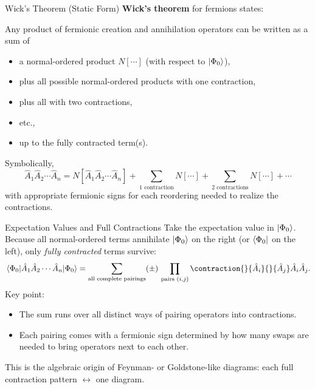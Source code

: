\documentclass[aspectratio=169]{beamer}
\begin{document}
\begin{frame}{Wick's Theorem (Static Form)}
\textbf{Wick's theorem} for fermions states:

Any product of fermionic creation and annihilation operators can be written
as a sum of
\begin{itemize}
    \item a normal-ordered product $N[\cdots]$ (with respect to $\ket{\Phi_0}$),
    \item plus all possible normal-ordered products with one contraction,
    \item plus all with two contractions,
    \item etc.,
    \item up to the fully contracted term(s).
\end{itemize}

Symbolically,
\begin{equation}
    \hat{A}_1 \hat{A}_2 \cdots \hat{A}_n
    =
    N[\hat{A}_1 \hat{A}_2 \cdots \hat{A}_n]
    + \sum_{\text{1 contraction}} N[\cdots]
    + \sum_{\text{2 contractions}} N[\cdots]
    + \cdots
\end{equation}
with appropriate fermionic signs for each reordering needed to realize
the contractions.
\end{frame}

\begin{frame}{Expectation Values and Full Contractions}
Take the expectation value in $\ket{\Phi_0}$.
Because all normal-ordered terms annihilate $\ket{\Phi_0}$ on the right
(or $\bra{\Phi_0}$ on the left), only \emph{fully contracted} terms survive:
\begin{equation}
    \mel{\Phi_0}{\hat{A}_1 \hat{A}_2 \cdots \hat{A}_n}{\Phi_0}
    =
    \sum_{\text{all complete pairings}}
    (\pm)\,
    \prod_{\text{pairs }(i,j)} 
        \contraction{}{\hat{A}_i}{}{\hat{A}_j}
        \hat{A}_i \hat{A}_j .
\end{equation}
Key point:
\begin{itemize}
    \item The sum runs over all distinct ways of pairing operators
    into contractions.
    \item Each pairing comes with a fermionic sign determined by how many
    swaps are needed to bring operators next to each other.
\end{itemize}

This is the algebraic origin of Feynman- or Goldstone-like diagrams:
each full contraction pattern $\leftrightarrow$ one diagram.
\end{frame}
\end{document}
